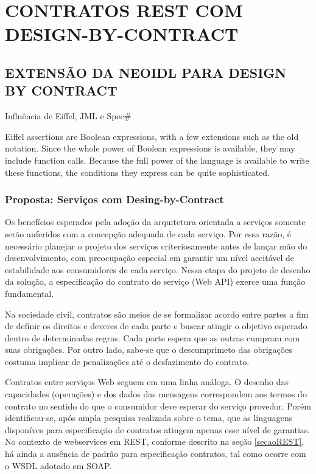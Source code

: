 \chapter{CONTRATOS REST COM DESIGN-BY-CONTRACT}

 
\section{EXTENSÃO DA NEOIDL PARA DESIGN BY CONTRACT}
\label{extensaoNeoIDL-DbC}

Influência de Eiffel, JML e Spec\#

Eiffel assertions are Boolean expressions, with a few extensions such as the old
notation. Since the whole power of Boolean expressions is available, they may
include function calls. Because the full power of the language is available to
write these functions, the conditions they express can be quite sophisticated.
\cite{meyer1992applying}

 
 
\subsection{Proposta: Serviços com Desing-by-Contract}
\vspace{-6mm}

Os benefícios esperados pela adoção da arquitetura orientada a serviços
somente serão auferidos com a concepção adequada de cada serviço. 
Por essa razão, é necessário planejar o projeto dos serviços criteriosamente
antes de lançar mão do desenvolvimento, com preocupação especial em garantir
um nível aceitável de estabilidade aos consumidores de cada serviço.
Nessa etapa do projeto de desenho da solução, a especificação do contrato do
serviço (Web API) exerce uma função fundamental. 

Na sociedade civil, contratos são meios de se formalizar acordo entre partes a
fim de definir os direitos e deveres de cada parte e buscar atingir o
objetivo esperado dentro de determinadas regras. Cada parte espera que as outras
cumpram com suas obrigações.
Por outro lado, sabe-se que o descumprimeto das obrigações costuma implicar de
penalizações até o desfazimento do contrato. 

Contratos entre serviços Web seguem em uma linha análoga. O desenho das
capacidades (operações) e dos dados das mensagens correspondem aos
termos do contrato no sentido do que o consumidor deve esperar do serviço
provedor. Porém identificou-se, após ampla pesquisa realizada sobre o tema, que
as linguagens disponíves para especificação de contratos atingem apenas esse
nível de garantias. No contexto de webservices em REST, conforme descrito na
seção \ref{secaoREST}, há ainda a ausência de padrão para especificação
contratos, tal como ocorre com o WSDL adotado em SOAP.

